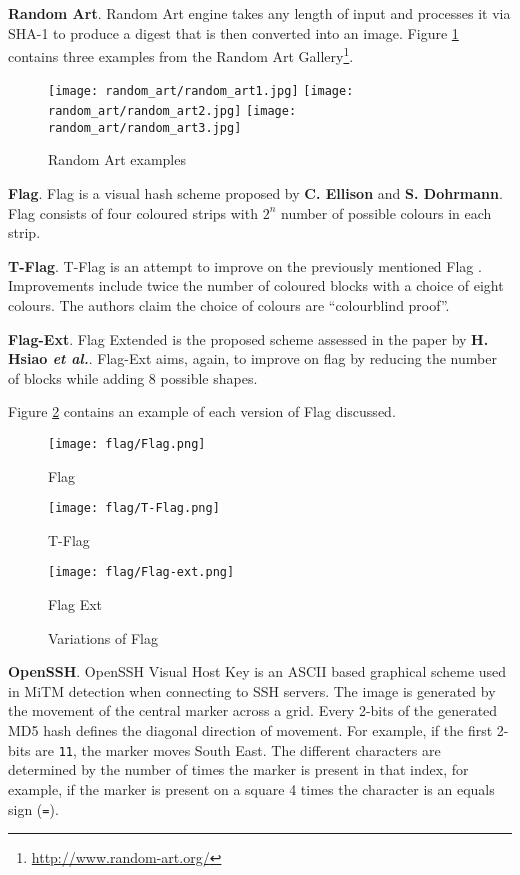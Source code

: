 \textbf{Random Art}. Random Art engine\cite{perrig1999hash} takes any length of input and processes it via SHA-1 to produce a digest that is then converted into an image. Figure \ref{fig:randomArt} contains three examples from the Random Art Gallery\footnote{\url{http://www.random-art.org/}}.

\begin{figure}[h!]
    \centering
        \texttt{[image: random\_art/random\_art1.jpg]}
    \endminipage
        \texttt{[image: random\_art/random\_art2.jpg]}
    \endminipage
        \texttt{[image: random\_art/random\_art3.jpg]}
    \endminipage
    \caption{Random Art examples}
    \label{fig:randomArt}
\end{figure}

\textbf{Flag}. Flag is a visual hash scheme proposed by \textbf{C. Ellison} and \textbf{S. Dohrmann}\cite{ellison2003public}. Flag consists of four coloured strips with $2^n$ number of possible colours in each strip. 

\textbf{T-Flag}. T-Flag is an attempt to improve on the previously mentioned Flag \cite{lin2010spate}. Improvements include twice the number of coloured blocks with a choice of eight colours. The authors claim the choice of colours are ``colourblind proof''.

\textbf{Flag-Ext}. Flag Extended is the proposed scheme assessed in the paper by \textbf{H. Hsiao \textit{et al.}}\cite{hsiao2009study}. Flag-Ext aims, again, to improve on flag by reducing the number of blocks while adding 8 possible shapes.

Figure \ref{fig:flag} contains an example of each version of Flag discussed.

\begin{figure}[h!]
    \centering
        \texttt{[image: flag/Flag.png]}
        \caption{Flag}
    \endminipage
        \texttt{[image: flag/T-Flag.png]}
        \caption{T-Flag}
    \endminipage
        \texttt{[image: flag/Flag-ext.png]}
        \caption{Flag Ext}
    \endminipage
    \caption{Variations of Flag}
    \label{fig:flag}
\end{figure}

\textbf{OpenSSH}. OpenSSH Visual Host Key is an ASCII based graphical scheme used in MiTM detection when connecting to SSH servers. The image is generated by the movement of the central marker across a grid. Every 2-bits of the generated MD5 hash defines the diagonal direction of movement. For example, if the first 2-bits are \verb|11|, the marker moves South East. The different characters are determined by the number of times the marker is present in that index, for example, if the marker is present on a square 4 times the character is an equals sign (\verb|=|).

